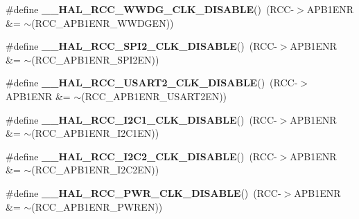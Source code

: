 \begin{DoxyCompactItemize}
\#define {\bfseries \+\_\+\+\_\+\+H\+A\+L\+\_\+\+R\+C\+C\+\_\+\+W\+W\+D\+G\+\_\+\+C\+L\+K\+\_\+\+D\+I\+S\+A\+B\+LE}()~(R\+CC-\/$>$A\+P\+B1\+E\+NR \&= $\sim$(R\+C\+C\+\_\+\+A\+P\+B1\+E\+N\+R\+\_\+\+W\+W\+D\+G\+EN))
\item 
\mbox{\label{group___r_c_c___a_p_b1___clock___enable___disable_gabb56a85a6424a60da8edc681f3a1c918}} 
\#define {\bfseries \+\_\+\+\_\+\+H\+A\+L\+\_\+\+R\+C\+C\+\_\+\+S\+P\+I2\+\_\+\+C\+L\+K\+\_\+\+D\+I\+S\+A\+B\+LE}()~(R\+CC-\/$>$A\+P\+B1\+E\+NR \&= $\sim$(R\+C\+C\+\_\+\+A\+P\+B1\+E\+N\+R\+\_\+\+S\+P\+I2\+EN))
\item 
\mbox{\label{group___r_c_c___a_p_b1___clock___enable___disable_ga1edc6c83fbebf8b4265ef9500aa04b04}} 
\#define {\bfseries \+\_\+\+\_\+\+H\+A\+L\+\_\+\+R\+C\+C\+\_\+\+U\+S\+A\+R\+T2\+\_\+\+C\+L\+K\+\_\+\+D\+I\+S\+A\+B\+LE}()~(R\+CC-\/$>$A\+P\+B1\+E\+NR \&= $\sim$(R\+C\+C\+\_\+\+A\+P\+B1\+E\+N\+R\+\_\+\+U\+S\+A\+R\+T2\+EN))
\item 
\mbox{\label{group___r_c_c___a_p_b1___clock___enable___disable_ga490a853eae72da96aad5379a6e939dd8}} 
\#define {\bfseries \+\_\+\+\_\+\+H\+A\+L\+\_\+\+R\+C\+C\+\_\+\+I2\+C1\+\_\+\+C\+L\+K\+\_\+\+D\+I\+S\+A\+B\+LE}()~(R\+CC-\/$>$A\+P\+B1\+E\+NR \&= $\sim$(R\+C\+C\+\_\+\+A\+P\+B1\+E\+N\+R\+\_\+\+I2\+C1\+EN))
\item 
\mbox{\label{group___r_c_c___a_p_b1___clock___enable___disable_ga3ebc5988bcf1e2965ed482fd76c67b22}} 
\#define {\bfseries \+\_\+\+\_\+\+H\+A\+L\+\_\+\+R\+C\+C\+\_\+\+I2\+C2\+\_\+\+C\+L\+K\+\_\+\+D\+I\+S\+A\+B\+LE}()~(R\+CC-\/$>$A\+P\+B1\+E\+NR \&= $\sim$(R\+C\+C\+\_\+\+A\+P\+B1\+E\+N\+R\+\_\+\+I2\+C2\+EN))
\item 
\mbox{\label{group___r_c_c___a_p_b1___clock___enable___disable_gaf3db86d2db2bad45732a742b6a91ea0b}} 
\#define {\bfseries \+\_\+\+\_\+\+H\+A\+L\+\_\+\+R\+C\+C\+\_\+\+P\+W\+R\+\_\+\+C\+L\+K\+\_\+\+D\+I\+S\+A\+B\+LE}()~(R\+CC-\/$>$A\+P\+B1\+E\+NR \&= $\sim$(R\+C\+C\+\_\+\+A\+P\+B1\+E\+N\+R\+\_\+\+P\+W\+R\+EN))
\end{DoxyCompactItemize}


